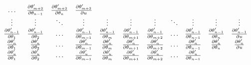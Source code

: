 \begin{linenomath}
\begin{equation}
\begin{split}
\begin{array}{ccccccccccc}
        \ldots &
        \frac{\partial \parameter[m+2]\proposed}{\partial \parameter[n-1]} &
        \frac{\partial \parameter[m+2]\proposed}{\partial \parameter[n]} &
        \frac{\partial \parameter[m+2]\proposed}{\partial \uniformdeviate} \\
        \vdots &
        \vdots &
        \ddots &
        \vdots &
        \vdots &
        \vdots &
        \vdots &
        \ddots &
        \vdots &
        \vdots &
        \vdots \\
        \frac{\partial \parameter[n-1]\proposed}{\partial \parameter[1]} &
        \frac{\partial \parameter[n-1]\proposed}{\partial \parameter[2]} &
        \ldots &
        \frac{\partial \parameter[n-1]\proposed}{\partial \parameter[m-1]} &
        \frac{\partial \parameter[n-1]\proposed}{\partial \parameter[m]} &
        \frac{\partial \parameter[n-1]\proposed}{\partial \parameter[m+1]} &
        \frac{\partial \parameter[n-1]\proposed}{\partial \parameter[m+2]} &
        \ldots &
        \frac{\partial \parameter[n-1]\proposed}{\partial \parameter[n-1]} &
        \frac{\partial \parameter[n-1]\proposed}{\partial \parameter[n]} &
        \frac{\partial \parameter[n-1]\proposed}{\partial \uniformdeviate} \\
        \frac{\partial \parameter[n]\proposed}{\partial \parameter[1]} &
        \frac{\partial \parameter[n]\proposed}{\partial \parameter[2]} &
        \ldots &
        \frac{\partial \parameter[n]\proposed}{\partial \parameter[m-1]} &
        \frac{\partial \parameter[n]\proposed}{\partial \parameter[m]} &
        \frac{\partial \parameter[n]\proposed}{\partial \parameter[m+1]} &
        \frac{\partial \parameter[n]\proposed}{\partial \parameter[m+2]} &
        \ldots &
        \frac{\partial \parameter[n]\proposed}{\partial \parameter[n-1]} &
        \frac{\partial \parameter[n]\proposed}{\partial \parameter[n]} &
        \frac{\partial \parameter[n]\proposed}{\partial \uniformdeviate} \\
        \frac{\partial \parameter[\uniformdeviate]\proposed}{\partial \parameter[1]} &
        \frac{\partial \parameter[\uniformdeviate]\proposed}{\partial \parameter[2]} &
        \ldots &
        \frac{\partial \parameter[\uniformdeviate]\proposed}{\partial \parameter[m-1]} &
        \frac{\partial \parameter[\uniformdeviate]\proposed}{\partial \parameter[m]} &
        \frac{\partial \parameter[\uniformdeviate]\proposed}{\partial \parameter[m+1]} &
        \frac{\partial \parameter[\uniformdeviate]\proposed}{\partial \parameter[m+2]} &
        \ldots &
        \frac{\partial \parameter[\uniformdeviate]\proposed}{\partial \parameter[n-1]} &

\end{array}
\end{split}
\end{equation}
\end{linenomath}
